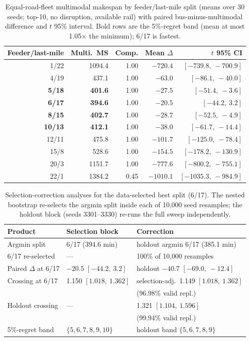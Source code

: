 \documentclass{ieeeaccess}
\begin{document}
\begin{table}[!t]
\caption{Equal-road-fleet multimodal makespan by feeder/last-mile split (means over 30 seeds; top-10, no disruption, available rail) with paired bus-minus-multimodal difference and $t$ 95\% interval. Bold rows are the 5\%-regret band (mean at most 1.05$\times$ the minimum); 6/17 is fastest.}
\label{tab:alloc}
\centering
\footnotesize
\begin{tabular}{@{}rrrrr@{}}
\hline
Feeder/last-mile & Multi.\ MS & Comp. & Mean $\Delta$ & $t$ 95\% CI \\
\hline
1/22 & 1094.4 & 1.00 & $-720.4$ & $[-739.8,\ -700.9]$ \\
4/19 & 437.1 & 1.00 & $-63.0$ & $[-86.1,\ -40.0]$ \\
\textbf{5/18} & \textbf{401.6} & 1.00 & $-27.5$ & $[-51.4,\ -3.6]$ \\
\textbf{6/17} & \textbf{394.6} & 1.00 & $-20.5$ & $[-44.2,\ 3.2]$ \\
\textbf{8/15} & \textbf{402.7} & 1.00 & $-28.7$ & $[-52.5,\ -4.9]$ \\
\textbf{10/13} & \textbf{412.1} & 1.00 & $-38.0$ & $[-61.7,\ -14.4]$ \\
12/11 & 475.8 & 1.00 & $-101.7$ & $[-125.0,\ -78.4]$ \\
15/8 & 528.6 & 1.00 & $-154.5$ & $[-178.2,\ -130.9]$ \\
20/3 & 1151.7 & 1.00 & $-777.6$ & $[-800.2,\ -755.1]$ \\
22/1 & 1384.2 & 0.45 & $-1010.1$ & $[-1035.3,\ -984.9]$ \\
\hline
\end{tabular}
\end{table}

\begin{table}[!t]
\caption{Selection-correction analyses for the data-selected best split (6/17). The nested bootstrap re-selects the argmin split inside each of 10{,}000 seed resamples; the holdout block (seeds 3301--3330) re-runs the full sweep independently.}
\label{tab:selection}
\centering
\footnotesize
\begin{tabular}{@{}lll@{}}
\hline
Product & Selection block & Correction \\
\hline
Argmin split & 6/17 (394.6 min) & holdout argmin 6/17 (385.1 min) \\
6/17 re-selected & --- & 100\% of 10{,}000 resamples \\
Paired $\Delta$ at 6/17 & $-20.5$ $[-44.2,\ 3.2]$ & holdout $-40.7$ $[-69.0,\ -12.4]$ \\
Crossing at 6/17 & 1.150 $[1.018,\ 1.362]$ & selection-adj.\ 1.149 $[1.018,\ 1.362]$ \\
 & & (96.98\% valid repl.) \\
Holdout crossing & --- & 1.321 $[1.104,\ 1.596]$ \\
 & & (99.94\% valid repl.) \\
5\%-regret band & $\{5,6,7,8,9,10\}$ & holdout band $\{5,6,7,8,9\}$ \\
\hline
\end{tabular}
\end{table}
\end{document}
